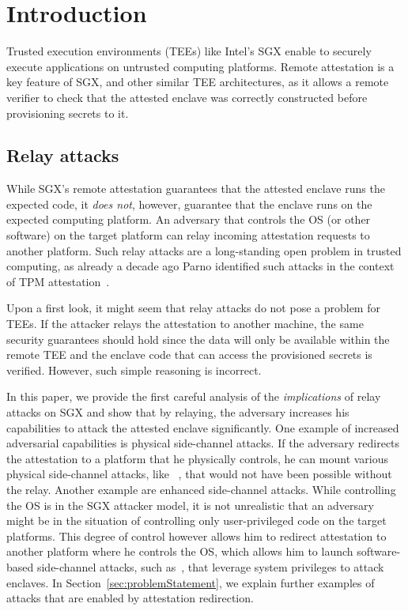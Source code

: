 \section{Introduction}
\label{sec:intro}


Trusted execution environments (TEEs) like Intel's SGX enable to securely execute applications on untrusted computing platforms. Remote attestation is a key feature of SGX, and other similar TEE architectures, as it allows a remote verifier to check that the attested enclave was correctly constructed before provisioning secrets to it. 


\subsection{Relay attacks}  While SGX's remote attestation guarantees that the attested enclave runs the expected code, it \emph{does not}, however,  guarantee that the enclave runs on the expected computing platform. An adversary that controls the OS (or other software) on the target platform can relay incoming attestation requests to another platform. Such relay attacks are a long-standing open problem in trusted computing, as already a decade ago Parno identified such attacks in the context of TPM attestation~\cite{parno2008bootstrapping}.


Upon a first look, it might seem that relay attacks do not pose a problem for TEEs. If the attacker relays the attestation to another machine, the same security guarantees should hold since the data will only be available within the remote TEE and the enclave code that can access the provisioned secrets is verified. However, such simple reasoning is incorrect. 

In this paper, we provide the first careful analysis of the \emph{implications} of relay attacks on SGX and show that by relaying, the adversary increases his capabilities to attack the attested enclave significantly. One example of increased adversarial capabilities is physical side-channel attacks. If the adversary redirects the attestation to a platform that he physically controls, he can mount various physical side-channel attacks, like ~\cite{genkin2016physical,wang2006covert,gandolfi2001electromagnetic, shamir2004acoustic}, that would not have been possible without the relay. Another example are enhanced side-channel attacks. While controlling the OS is in the SGX attacker model, it is not unrealistic that an adversary might be in the situation of controlling only user-privileged code on the target platforms. This degree of control however allows him to redirect attestation to another platform where he controls the OS, which allows him to launch software-based side-channel attacks, such as~\cite{moghimi2017cachezoom, sgxcache, gotzfried2017cache}, that leverage system privileges to attack enclaves. In Section~\ref{sec:problemStatement}, we explain further examples of attacks that are enabled by attestation redirection.




